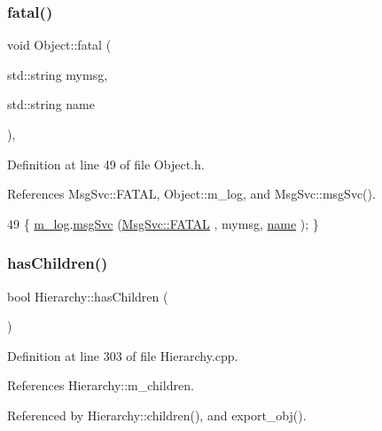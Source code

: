 \subsubsection{\texorpdfstring{fatal()}{fatal()}\hspace{0.1cm}{\footnotesize\ttfamily [2/2]}}
{\footnotesize\ttfamily void Object\+::fatal (\begin{DoxyParamCaption}\item[{std\+::string}]{mymsg,  }\item[{std\+::string}]{name }\end{DoxyParamCaption})\hspace{0.3cm}{\ttfamily [inline]}, {\ttfamily [inherited]}}



Definition at line 49 of file Object.\+h.



References Msg\+Svc\+::\+F\+A\+T\+AL, Object\+::m\+\_\+log, and Msg\+Svc\+::msg\+Svc().


\begin{DoxyCode}
49 \{ \hyperlink{classObject_a0d269813dd7ac1f24bc143031e2963f2}{m\_log}.\hyperlink{classMsgSvc_ad25f18047920cc59a314e5098259711c}{msgSvc} (\hyperlink{classMsgSvc_ae671eb7301996cd049d2da8a65925926a59c73cb29edfc9cdf35845e2b1301363}{MsgSvc::FATAL}   , mymsg, \hyperlink{classObject_a300f4c05dd468c7bb8b3c968868443c1}{name} ); \}
\end{DoxyCode}
\mbox{\label{classHierarchy_a255174fe4d316d2a3f430dcb9dab29f1}} 
\subsubsection{\texorpdfstring{has\+Children()}{hasChildren()}}
{\footnotesize\ttfamily bool Hierarchy\+::has\+Children (\begin{DoxyParamCaption}{ }\end{DoxyParamCaption})\hspace{0.3cm}{\ttfamily [inherited]}}



Definition at line 303 of file Hierarchy.\+cpp.



References Hierarchy\+::m\+\_\+children.



Referenced by Hierarchy\+::children(), and export\+\_\+obj().


